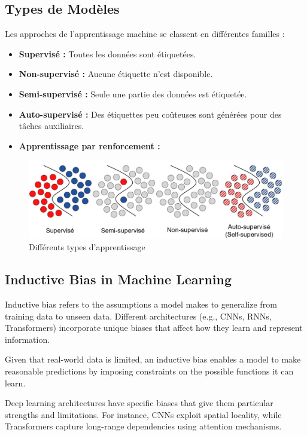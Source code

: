 \documentclass{article}
\begin{document}
\subsection{Types de Modèles}
Les approches de l'apprentissage machine se classent en différentes familles :
\begin{itemize}
    \item \textbf{Supervisé :} Toutes les données sont étiquetées.
    \item \textbf{Non-supervisé :} Aucune étiquette n’est disponible.
    \item \textbf{Semi-supervisé :} Seule une partie des données est étiquetée.
    \item \textbf{Auto-supervisé :} Des étiquettes peu coûteuses sont générées pour des tâches auxiliaires.
    \item \textbf{Apprentissage par renforcement :}
\end{itemize}

\begin{figure}[ht]
    \centering
    \includegraphics[width=\linewidth]{graphics/learning_type.png}
    \caption{Différents types d’apprentissage}
    \label{fig:learning-types}
\end{figure}

\subsection{Inductive Bias in Machine Learning}
Inductive bias refers to the assumptions a model makes to generalize from training data to unseen data. Different architectures (e.g., CNNs, RNNs, Transformers) incorporate unique biases that affect how they learn and represent information.

Given that real-world data is limited, an inductive bias enables a model to make reasonable predictions by imposing constraints on the possible functions it can learn.

Deep learning architectures have specific biases that give them particular strengths and limitations. For instance, CNNs exploit spatial locality, while Transformers capture long-range dependencies using attention mechanisms.
\end{document}
